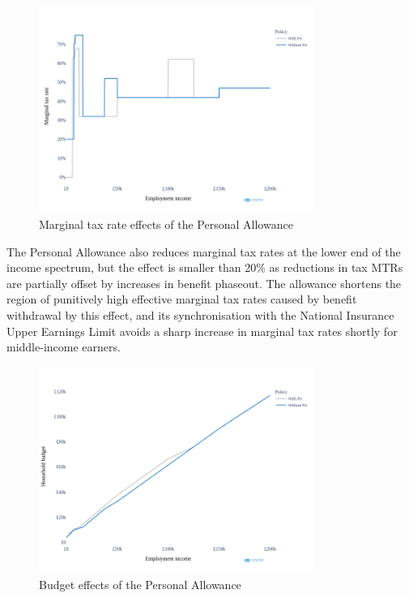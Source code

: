 \documentclass{article}
\begin{document}
    \begin{figure}
        \centering
        \includegraphics[width=0.8\textwidth]{images/fig_2.png}
        \caption{Marginal tax rate effects of the Personal Allowance}
        \label{fig:PA_mtr_effects}
    \end{figure}
    
    The Personal Allowance also reduces marginal tax rates at the lower end of the income spectrum, but the effect is smaller than 20\% as reductions in tax MTRs are partially offset by increases in benefit phaseout. The allowance shortens the region of punitively high effective marginal tax rates caused by benefit withdrawal by this effect, and its synchronisation with the National Insurance Upper Earnings Limit avoids a sharp increase in marginal tax rates shortly for middle-income earners.

    \begin{figure}
        \centering
        \includegraphics[width=0.8\textwidth]{images/fig_3.png}
        \caption{Budget effects of the Personal Allowance}
        \label{fig:PA_budget_effects}
    \end{figure}
\end{document}
